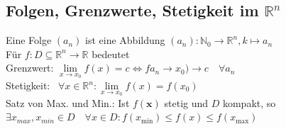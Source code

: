\documentclass[6pt,a4paper]{scrartcl}
\newcommand{\norm}[1]{\ensuremath{\|#1\|}}                                                      %
\renewcommand{\vec}[1]{\ensuremath{\boldsymbol {#1}}}                                           %
\begin{document}
\begin{multicols*}{4}
    \subsection{Folgen, Grenzwerte, Stetigkeit im $\mathbb R^n$}
    Eine Folge $(a_n)$ ist eine Abbildung $(a_n):\mathbb N_0 \rightarrow \mathbb R^n, k\mapsto a_n$\\
    Für $f:D \subseteq \mathbb R^n \rightarrow \mathbb R$ bedeutet \\
    Grenzwert: \quad  $\lim\limits_{x \rightarrow x_0} f(x) =c \Leftrightarrow f a_n \rightarrow x_0 \bigr) \rightarrow c\quad \forall a_n$\\
    Stetigkeit: \quad \ $\forall x \in \mathbb R^n:\lim\limits_{x \rightarrow x_0} f(x) = f(x_0)$\\
    Satz von Max. und Min.: Ist $f(\vec x)$ stetig und $D$ kompakt, so\\
    $\exists x_{max},x_{min} \in D \quad \forall x\in D:f(x_{\text{min}}) \le f(x) \le f(x_{\text{max}})$


\end{multicols*}
\end{document}
